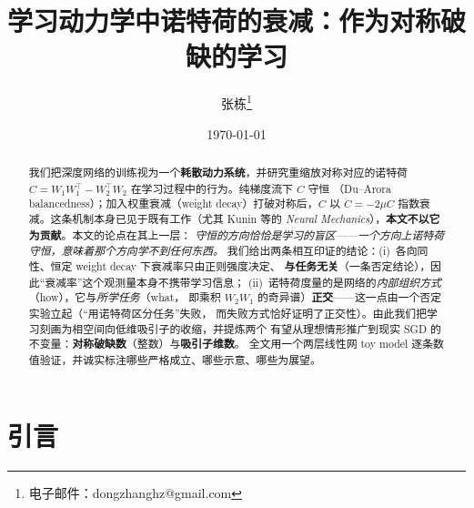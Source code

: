 \documentclass[11pt]{article}
\title{学习动力学中诺特荷的衰减：作为对称破缺的学习}
\author{张栋\thanks{电子邮件：dongzhanghz@gmail.com}}
\date{\today}
\begin{document}
\maketitle

\newcommand{\Wone}{W_1}
\newcommand{\Wtwo}{W_2}
\newcommand{\Cmat}{C}
\newcommand{\trace}{\operatorname{tr}}
\newcommand{\norm}[1]{\left\lVert #1 \right\rVert}


\begin{abstract}
\noindent
我们把深度网络的训练视为一个\textbf{耗散动力系统}，并研究重缩放对称对应的诺特荷
$\Cmat = \Wone\Wone^\top - \Wtwo^\top\Wtwo$ 在学习过程中的行为。纯梯度流下 $\Cmat$ 守恒
（Du--Arora balancedness）；加入权重衰减（weight decay）打破对称后，$\Cmat$ 以
$\dot\Cmat=-2\mu\Cmat$ 指数衰减。这条机制本身已见于既有工作（尤其 Kunin 等的
\emph{Neural Mechanics}），\textbf{本文不以它为贡献}。本文的论点在其上一层：
\emph{守恒的方向恰恰是学习的盲区——一个方向上诺特荷守恒，意味着那个方向学不到任何东西。}
我们给出两条相互印证的结论：(i)~各向同性、恒定 weight decay 下衰减率只由正则强度决定、
\textbf{与任务无关}（一条否定结论），因此“衰减率”这个观测量本身不携带学习信息；
(ii)~诺特荷度量的是网络的\emph{内部组织方式}（how），它与\emph{所学任务}（what，
即乘积 $\Wtwo\Wone$ 的奇异谱）\textbf{正交}——这一点由一个否定实验立起（“用诺特荷区分任务”失败，
而失败方式恰好证明了正交性）。由此我们把学习刻画为相空间向低维吸引子的收缩，并提炼两个
有望从理想情形推广到现实 SGD 的不变量：\textbf{对称破缺数}（整数）与\textbf{吸引子维数}。
全文用一个两层线性网 toy model 逐条数值验证，并诚实标注哪些严格成立、哪些示意、哪些为展望。
\end{abstract}


\section{引言}\label{sec:intro}
\end{document}
